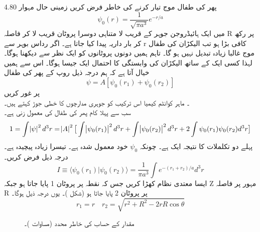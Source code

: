  پھر کی طفال موج تیار کرنے کی خاطر فرض کریں زمینی حال مہوار 4.80
\[\psi_{0}(r)=\frac{1}{\sqrt{\pi a^{3}}}e^{-r/a}\]
 میں ایک ہائیڈروجن جوہر کے قریب لا متناہی دوسرا پروٹان قریب لا کر فاصلہ R پر رکھ کر بار داریہ پیدا کیا جاتا ہے۔ اگر رداس بوہر سے r کافی بڑا ہو تب الیکڑان کی طفال موج غالبا زیادہ تبدیل نہیں ہو گا۔ تاہم ہمیں دونوں پروٹانوں کو ایک نظر سے دیکھنا ہوگا۔ لہذا کسی ایک کے ساتھ الیکڑان کی وابستگی کا احتمال ایک  جیسا ہوگا۔ اس سے ہمیں خیال آتا ہے کہ ہم درجہ ذیل روپ کے پھر کی طفال 
 \[\psi=A[\psi_{0}(r_{1})+\psi_{0}(r_{2})]\]
 پر غور کریں\\
۔ ماہر کوانٹم کیمیا اس ترکیب کو جوہری مدارچوں کا خطی جوڑ کہتے ہیں۔ \\
سب سے پہلا کام پھر کی طفال کی معمول زنی ہے۔
 \[1=\int\abs{\psi}^{2}d^{3}r=\abs{A}^{2}\big [\int \abs{\psi_{0}(r_{1})}^{2}d^{3}r+\int \abs{\psi_{0}(r_{2})}^{2}d^{3}r+2\int\psi_{0}(r_{1})\psi_{0}(r_{2})d^{3}r\big ]\]
پہلے دو تکلملات کا نتیجہ ایک ہے۔ چونکہ 
\(\psi_{0}\)
خود معمول شدہ ہے۔ تیسرا زیادہ پیچیدہ ہے۔ درجہ ذیل فرض کریں۔\\
 \[I\equiv\langle \psi_{0}(r_{1})|\psi_{0}(r_{2})\rangle=\frac{1}{\pi a^{3}}\int e^{-(r_{1}+r_{2})/a}d^{3}r\]
ایسا معتدی نظام کھڑا کریں جس کہ نقطہ پر پروٹان 1 پایا جاتا ہو جبکہ Z مہور پر فاصلہ R پر پروٹان 2 پایا جاتا ہو (شکل )۔ یوں درجہ ذیل ہوگا۔ \\
\[r_{1}=r \quad r_{2}=\sqrt{r^{2}+R^{2}-2rR\cos{\theta}}\]
%
\begin{figure}
\centering
{}
\caption{مقدار  کے حساب کی خاطر محدد (مساوات )۔}
\label{شکل_تغیریت_محدد_قدار_آئے}
\end{figure}

